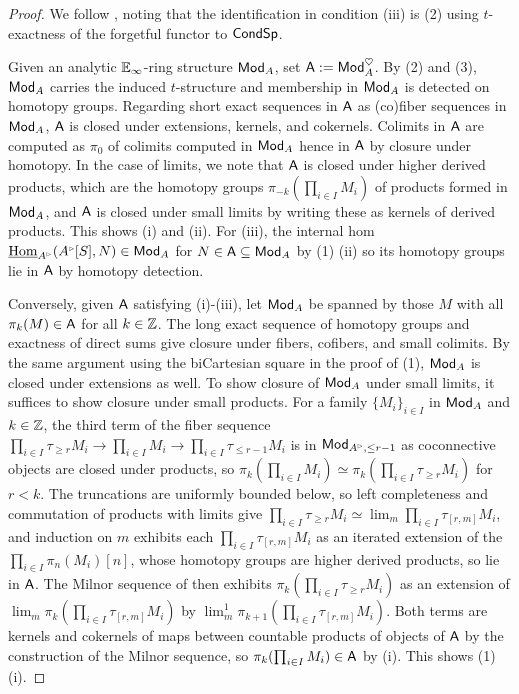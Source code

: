 \begin{proof}
    We follow \cite[Prop. 4.4.2 \& Thm. 4.4.1]{CamargoSolid}, noting that the identification in condition (iii) is  (2) using $t$-exactness of the forgetful functor to $\mathsf{Cond}\mathsf{Sp}$.  

    Given an analytic $\mathbb{E}_{\infty}$-ring structure $\mathsf{Mod}_{A}$, set $\mathsf{A}:=\mathsf{Mod}_{A}^{\heartsuit}$. By  (2) and (3), $\mathsf{Mod}_{A}$ carries the induced $t$-structure and membership in $\mathsf{Mod}_{A}$ is detected on homotopy groups. Regarding short exact sequences in $\mathsf{A}$ as (co)fiber sequences in $\mathsf{Mod}_{A}$, $\mathsf{A}$ is closed under extensions, kernels, and cokernels. Colimits in $\mathsf{A}$ are computed as $\pi_{0}$ of colimits computed in $\mathsf{Mod}_{A}$ hence in $\mathsf{A}$ by closure under homotopy. In the case of limits, we note that $\mathsf{A}$ is closed under higher derived products, which are the homotopy groups $\pi_{-k}(\prod_{i\in I}M_{i})$ of products formed in $\mathsf{Mod}_{A}$, and $\mathsf{A}$ is closed under small limits by writing these as kernels of derived products. This shows (i) and (ii). For (iii), the internal hom $\intHom_{A^{\tri}}(A^{\tri}[S],N)\in\Mod_{A}$ for $N\in\mathsf{A}\subseteq\mathsf{Mod}_{A}$ by  (1) (ii) so its homotopy groups lie in $\mathsf{A}$ by homotopy detection.  

    Conversely, given $\mathsf{A}$ satisfying (i)-(iii), let $\mathsf{Mod}_{A}$ be spanned by those $M$ with all $\pi_{k}(M)\in\mathsf{A}$ for all $k\in\mathbb{Z}$. The long exact sequence of homotopy groups and exactness of direct sums give closure under fibers, cofibers, and small colimits. By the same argument using the biCartesian square in the proof of  (1), $\mathsf{Mod}_{A}$ is closed under extensions as well. To show closure of $\mathsf{Mod}_{A}$ under small limits, it suffices to show closure under small products. For a family $\{M_{i}\}_{i\in I}$ in $\mathsf{Mod}_{A}$ and $k\in\mathbb{Z}$, the third term of the fiber sequence $\prod_{i\in I}\tau_{\geq r}M_{i}\to\prod_{i\in I}M_{i}\to\prod_{i\in I}\tau_{\leq r-1}M_{i}$ is in $\Mod_{A^{\tri},\leq r-1}$ as coconnective objects are closed under products, so $\pi_{k}(\prod_{i\in I}M_{i})\simeq\pi_{k}(\prod_{i\in I}\tau_{\geq r}M_{i})$ for $r<k$. The truncations are uniformly bounded below, so left completeness and commutation of products with limits give $\prod_{i\in I}\tau_{\geq r}M_{i}\simeq\lim_{m}\prod_{i\in I}\tau_{[r,m]}M_{i}$, and induction on $m$ exhibits each $\prod_{i\in I}\tau_{[r,m]}M_{i}$ as an iterated extension of the $\prod_{i\in I}\pi_{n}(M_{i})[n]$, whose homotopy groups are higher derived products, so lie in $\mathsf{A}$. The Milnor sequence of  then exhibits $\pi_{k}(\prod_{i\in I}\tau_{\geq r}M_{i})$ as an extension of $\lim_{m}\pi_{k}(\prod_{i\in I}\tau_{[r,m]}M_{i})$ by $\lim^{1}_{m}\pi_{k+1}(\prod_{i\in I}\tau_{[r,m]}M_{i})$. Both terms are kernels and cokernels of maps between countable products of objects of $\mathsf{A}$ by the construction of the Milnor sequence, so $\pi_{k}(\prod_{i\in I}M_{i})\in\mathsf{A}$ by (i). This shows  (1) (i). 
    

\end{proof}

